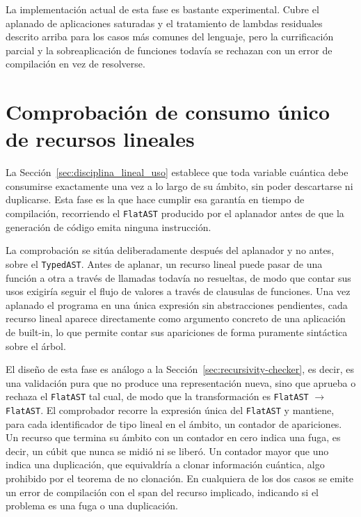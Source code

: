 La implementación actual de esta fase es bastante experimental. Cubre el aplanado de aplicaciones saturadas y el tratamiento de lambdas residuales descrito arriba para los casos más comunes del lenguaje, pero la currificación parcial y la sobreaplicación de funciones todavía se rechazan con un error de compilación en vez de resolverse.

\section{Comprobación de consumo único de recursos lineales}
\label{sec:linear-checker}

La Sección~\ref{sec:disciplina_lineal_uso} establece que toda variable cuántica debe consumirse exactamente una vez a lo largo de su ámbito, sin poder descartarse ni duplicarse. Esta fase es la que hace cumplir esa garantía en tiempo de compilación, recorriendo el \lstinline|FlatAST| producido por el aplanador antes de que la generación de código emita ninguna instrucción.

La comprobación se sitúa deliberadamente después del aplanador y no antes, sobre el \lstinline|TypedAST|. Antes de aplanar, un recurso lineal puede pasar de una función a otra a través de llamadas todavía no resueltas, de modo que contar sus usos exigiría seguir el flujo de valores a través de clausulas de funciones. Una vez aplanado el programa en una única expresión sin abstracciones pendientes, cada recurso lineal aparece directamente como argumento concreto de una aplicación de built-in, lo que permite contar sus apariciones de forma puramente sintáctica sobre el árbol.

El diseño de esta fase es análogo a la Sección~\ref{sec:recursivity-checker}, es decir, es una validación pura que no produce una representación nueva, sino que aprueba o rechaza el \lstinline|FlatAST| tal cual, de modo que la transformación es \lstinline|FlatAST| $\to$ \lstinline|FlatAST|. El comprobador recorre la expresión única del \lstinline|FlatAST| y mantiene, para cada identificador de tipo lineal en el ámbito, un contador de apariciones. Un recurso que termina su ámbito con un contador en cero indica una fuga, es decir, un cúbit que nunca se midió ni se liberó. Un contador mayor que uno indica una duplicación, que equivaldría a clonar información cuántica, algo prohibido por el teorema de no clonación. En cualquiera de los dos casos se emite un error de compilación con el span del recurso implicado, indicando si el problema es una fuga o una duplicación.

